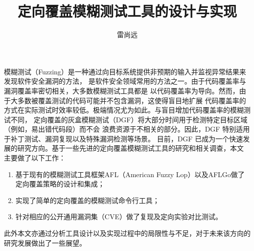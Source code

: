 \documentclass[bachelor]{njupthesis}
\title{定向覆盖模糊测试工具的设计与实现}
\author{雷尚远}
\begin{document}
\makecover

\begin{chineseabstract}
模糊测试（Fuzzing）是一种通过向目标系统提供非预期的输入并监视异常结果来发现软件安全漏洞的方法，
是软件安全领域常用的方法之一。由于代码覆盖率与漏洞覆盖率密切相关，大多数模糊测试工具都是
以代码覆盖率为导向。然而，由于大多数被覆盖测试的代码可能并不包含漏洞，这使得盲目地扩展
代码覆盖率的方式在实际测试时效率较低。极端情况尤为如此。与盲目增加代码覆盖率的模糊测试不同，
定向覆盖的灰盒模糊测试（DGF）将大部分时间用于检测特定目标区域（例如，易出错代码段）而不会
浪费资源于不相关的部分。因此，DGF 特别适用于补丁测试、漏洞复现以及特殊漏洞检测等场景。
目前，DGF 已成为一个快速发展的研究方向。基于一些先进的定向覆盖模糊测试工具的研究和相关调查，本文
主要做了以下工作：
\begin{enumerate}[label=(\arabic*),leftmargin=48pt]
	\item 基于现有的模糊测试工具框架AFL（American Fuzzy Lop）以及AFLGo做了定向覆盖策略的设计和集成；
	\item 实现了简单的定向覆盖的模糊测试命令行工具；
	\item 针对相应的公开通用漏洞集（CVE）做了复现及定向实验对比测试。
\end{enumerate}

此外本文亦通过分析工具设计以及实现过程中的局限性与不足，对于未来该方向的研究发展做出了一些展望。

\end{chineseabstract}
\end{document}
